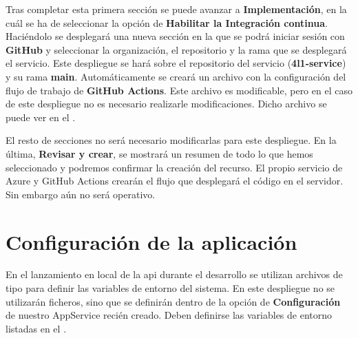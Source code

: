 Tras completar esta primera sección se puede avanzar a \textbf{Implementación}, en la cuál se ha de seleccionar la opción de \textbf{Habilitar la Integración continua}. Haciéndolo se desplegará una nueva sección en la que se podrá iniciar sesión con \textbf{GitHub} y seleccionar la organización, el repositorio y la rama que se desplegará el servicio. Este despliegue se hará sobre el repositorio del servicio (\textbf{4l1-service}) y su rama \textbf{main}. Automáticamente se creará un archivo con la configuración del flujo de trabajo de \textbf{GitHub Actions}. Este archivo es modificable, pero en el caso de este despliegue no es necesario realizarle modificaciones. Dicho archivo se puede ver en el  .

El resto de secciones no será necesario modificarlas para este despliegue. En la última, \textbf{Revisar y crear}, se mostrará un resumen de todo lo que hemos seleccionado y podremos confirmar la creación del recurso. El propio servicio de Azure y GitHub Actions crearán el flujo que desplegará el código en el servidor. Sin embargo aún no será operativo.

\section{Configuración de la aplicación}
\label{sec:variables_entorno}

En el lanzamiento en local de la \acrshort{api} durante el desarrollo se utilizan archivos de tipo  para definir las variables de entorno del sistema. En este despliegue no se utilizarán ficheros, sino que se definirán dentro de la opción de \textbf{Configuración} de nuestro AppService recién creado. Deben definirse las variables de entorno listadas en el .

